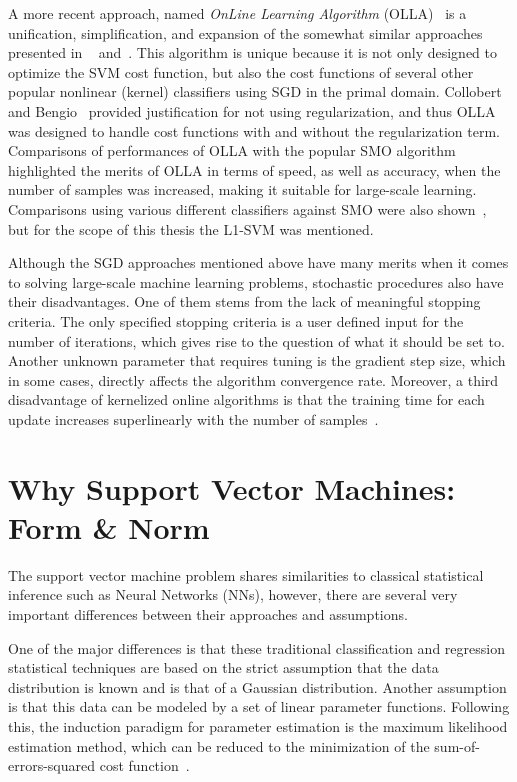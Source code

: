 \documentclass[reqno]{vcuthesis}
\numberwithin{equation}{chapter}
\begin{document}
A more recent approach, named \textit{OnLine Learning Algorithm} (OLLA)~\cite{kecman2016fast} is a unification, simplification, and expansion of the somewhat similar approaches presented in
~\cite{herbrich2016learning,kivinen2002large,Schoelkopf2002,Shalev2014,shalev2011pegasos} and~\cite{kecman2016ieee,Melki2016,melki2016fast}. This algorithm is unique because it is not only designed to optimize the SVM cost function, but also the cost functions of several other popular nonlinear (kernel) classifiers using SGD in the primal domain. Collobert and Bengio~\cite{collobert2004links} provided justification for not using regularization, and thus OLLA was designed to handle cost functions with and without the regularization term. Comparisons of performances of OLLA with the popular SMO algorithm highlighted the merits of OLLA in terms of speed, as well as accuracy, when the number of samples was increased, making it suitable for large-scale learning. Comparisons using various different classifiers against SMO were also shown~\cite{kecman2016fast}, but for the scope of this thesis the L1-SVM was mentioned.

Although the SGD approaches mentioned above have many merits when it comes to solving large-scale machine learning problems, stochastic procedures also have their disadvantages. One of them stems from the lack of meaningful stopping criteria. The only specified stopping criteria is a user defined input for the number of iterations, which gives rise to the question of what it should be set to. Another unknown parameter that requires tuning is the gradient step size, which in some cases, directly affects the algorithm convergence rate. Moreover, a third disadvantage of kernelized online algorithms is that the training time for each update increases superlinearly with the number of samples~\cite{bottou2004large}.

\section{Why Support Vector Machines: Form \& Norm}
The support vector machine problem shares similarities to classical statistical inference such as Neural Networks (NNs), however, there are several very important differences between their approaches and assumptions. 

One of the major differences is that these traditional classification and regression statistical techniques are based on the strict assumption that the data distribution is known and is that of a Gaussian distribution. Another assumption is that this data can be modeled by a set of linear parameter functions. Following this, the induction paradigm for parameter estimation is the maximum likelihood estimation method, which can be reduced to the minimization of the sum-of-errors-squared cost function~\cite{Kecman2001}. 
\end{document}
